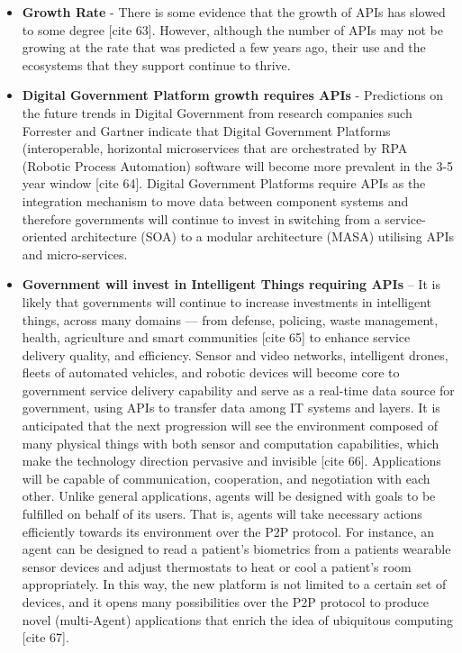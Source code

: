 \begin{itemize}
	\item \textbf{Growth Rate} - There is some evidence that the growth of APIs has slowed
	to some degree [cite 63]. However, although the number of APIs may not be
	growing at the rate that was predicted a few years ago, their use and the
	ecosystems that they support continue to thrive.
	
	\item \textbf{Digital Government Platform growth requires APIs} - Predictions on the
	future trends in Digital Government from research companies such Forrester
	and Gartner indicate that Digital Government Platforms (interoperable,
	horizontal microservices that are orchestrated by RPA (Robotic Process
	Automation) software will become more prevalent in the 3-5 year window [cite 64].
	Digital Government Platforms require APIs as the integration mechanism to move
	data between component systems and therefore governments will continue to
	invest in switching from a service-oriented architecture (SOA) to a modular
	architecture (MASA) utilising APIs and micro-services.
	
	\item \textbf{Government will invest in Intelligent Things requiring APIs} – It is
	likely that governments will continue to increase investments in intelligent
	things, across many domains — from defense,	policing, waste management, health, agriculture and smart communities [cite 65] to enhance service delivery quality,
	and	efficiency. Sensor and video networks, intelligent drones, fleets of automated
	vehicles, and robotic devices will become core to government service delivery
	capability and serve as a real-time data source for government, using APIs to
	transfer data among IT systems and layers. It is anticipated that the next
	progression will see the environment composed of many physical things with both
	sensor and computation capabilities, which make the technology direction
	pervasive and invisible [cite 66]. Applications will be capable of
	communication, cooperation, and negotiation with each other. Unlike general
	applications, agents will be designed with goals to be fulfilled on behalf
	of its users. That is, agents will take necessary actions efficiently towards
	its environment over the P2P protocol. For instance, an agent can be designed
	to read a patient’s biometrics from a patients wearable sensor devices and
	adjust thermostats to heat or cool a patient’s room appropriately. In this way,
	the new platform is not limited to a certain set of devices, and it opens many possibilities over the P2P protocol to produce novel (multi-Agent) applications
	that enrich the idea of ubiquitous computing [cite 67].
	

\end{itemize}
